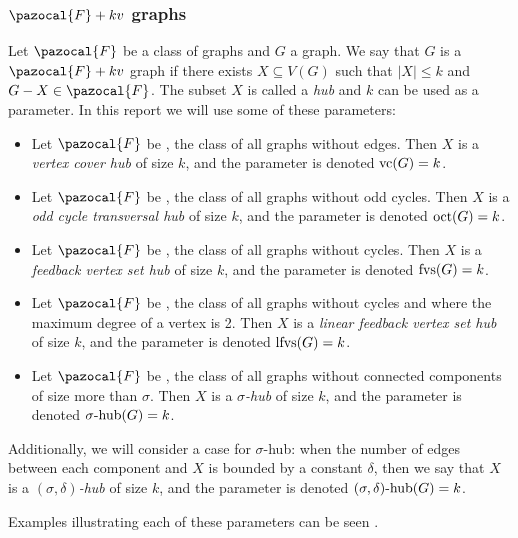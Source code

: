 

\subsubsection*{$\pazocal{F} + kv$ graphs}

Let $\pazocal{F}$ be a class of graphs and $G$ a graph. We say that $G$ is a $\pazocal{F} + kv$ graph if there exists $X \subseteq V(G)$ such that $|X| \leq k$ and $G - X \in \pazocal{F}$. The subset $X$ is called a \textit{hub} and $k$ can be used as a parameter. In this report we will use some of these parameters:

\begin{itemize}
    \item Let $\pazocal{F}$ be , the class of all graphs without edges. Then $X$ is a \textit{vertex cover hub} of size $k$, and the parameter is denoted $\text{vc}(G) = k$.
    \item Let $\pazocal{F}$ be , the class of all graphs without odd cycles. Then $X$ is a \textit{odd cycle transversal hub} of size $k$, and the parameter is denoted $\text{oct}(G) = k$.
    \item Let $\pazocal{F}$ be , the class of all graphs without cycles. Then $X$ is a \textit{feedback vertex set hub} of size $k$, and the parameter is denoted $\text{fvs}(G) = k$.
    \item Let $\pazocal{F}$ be , the class of all graphs without cycles and where the maximum degree of a vertex is 2. Then $X$ is a  \textit{linear feedback vertex set hub} of size $k$, and the parameter is denoted $\text{lfvs}(G) = k$.
    \item Let $\pazocal{F}$ be , the class of all graphs without connected components of size more than $\sigma$. Then $X$ is a \textit{$\sigma$-hub} of size $k$, and the parameter is denoted $\sigma\text{-hub}(G) = k$.
\end{itemize}

\medskip

Additionally, we will consider a case for $\sigma$-hub: when the number of edges between each component and $X$ is bounded by a constant $\delta$, then we say that $X$ is a \textit{$(\sigma, \delta)$-hub} of size $k$, and the parameter is denoted $(\sigma, \delta)\text{-hub}(G) = k$.

Examples illustrating each of these parameters can be seen .

